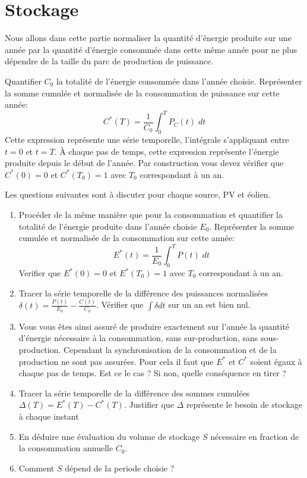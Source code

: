 \documentclass[12pt,a4]{article}
\begin{document}
\section{Stockage}
Nous allons dans cette partie normaliser la quantité d'énergie produite sur une année par la quantité d'énergie consommée dans cette même année pour ne plus dépendre de la taille du parc de production de puissance.

Quantifier $C_0$ la totalité de l'énergie consommée dans l'année choisie. Représenter la somme cumulée et normalisée de la consommation de puissance sur cette année:
\begin{equation}
	C^*(T)  = \frac{1}{C_0} \int_{0}^{T}P_C(t) \; d t	
\end{equation}
Cette expression représente une série temporelle, l'intégrale  s'appliquant entre $t=0$ et $t=T$. À chaque pas de temps, cette expression représente l'énergie produite depuis le début de l'année. Par construction vous devez vérifier que $C^*(0)=0$ et $C^*(T_0)=1$ avec $T_0$ correspondant à un an. 


Les questions suivantes sont à discuter pour chaque source, PV et éolien.
\begin{enumerate}
	\item Procéder de la même manière que pour la consommation et quantifier la totalité de l'énergie produite dans l'année choisie $E_0$. Représenter la somme cumulée et normalisée de la consommation sur cette année: 
	\begin{equation}
	E^*(t)  = \frac{1}{E_0} \int_{0}^{T} P(t) \; d t	
	\end{equation}
	Verifier que $E^*(0)=0$ et $E^*(T_0)=1$ avec $T_0$ correspondant à un an. 
	
	\item Tracer la série temporelle de la différence des puissances normalisées $\delta(t) = \frac{P(t)}{E_0} - \frac{C(t)}{C_0}$. Vérifier que $\int \delta dt $ sur un an est bien nul.
	
	\item Vous vous êtes ainsi assuré de produire exactement sur l'année la quantité d'énergie nécessaire à la consommation, sans sur-production, sans sous-production. Cependant la synchronisation de la consommation et de la production ne sont pas assurées. Pour cela il faut que $E^*$ et $C^*$ soient égaux à chaque pas de temps. Est ce le cas ? Si non, quelle conséquence en tirer ?
	
	
	
	\item Tracer la série temporelle de la différence des sommes cumulées $\Delta(T) = E^*(T) - C^*(T)$. Justifier que $\Delta $ représente le besoin de stockage à chaque instant
	
	\item En déduire une évaluation du volume de stockage $S$ nécessaire en fraction de la consommation annuelle $C_0$.
	
	\item Comment $S$ dépend de la periode choisie ?
	
\end{enumerate}
\end{document}
